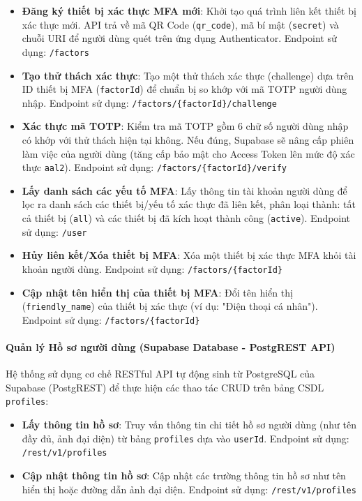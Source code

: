 \begin{itemize}
\item \textbf{Đăng ký thiết bị xác thực MFA mới}:
Khởi tạo quá trình liên kết thiết bị xác thực mới. API trả về mã QR Code (\texttt{qr\_code}), mã bí mật (\texttt{secret}) và chuỗi URI để người dùng quét trên ứng dụng Authenticator.
Endpoint sử dụng: \texttt{/factors}

\item \textbf{Tạo thử thách xác thực}:
Tạo một thử thách xác thực (challenge) dựa trên ID thiết bị MFA (\texttt{factorId}) để chuẩn bị so khớp với mã TOTP người dùng nhập.
Endpoint sử dụng: \texttt{/factors/\{factorId\}/challenge}

\item \textbf{Xác thực mã TOTP}:
Kiểm tra mã TOTP gồm 6 chữ số người dùng nhập có khớp với thử thách hiện tại không. Nếu đúng, Supabase sẽ nâng cấp phiên làm việc của người dùng (tăng cấp bảo mật cho Access Token lên mức độ xác thực \texttt{aal2}).
Endpoint sử dụng: \texttt{/factors/\{factorId\}/verify}

\item \textbf{Lấy danh sách các yếu tố MFA}:
Lấy thông tin tài khoản người dùng để lọc ra danh sách các thiết bị/yếu tố xác thực đã liên kết, phân loại thành: tất cả thiết bị (\texttt{all}) và các thiết bị đã kích hoạt thành công (\texttt{active}).
Endpoint sử dụng: \texttt{/user}

\item \textbf{Hủy liên kết/Xóa thiết bị MFA}:
Xóa một thiết bị xác thực MFA khỏi tài khoản người dùng.
Endpoint sử dụng: \texttt{/factors/\{factorId\}}

\item \textbf{Cập nhật tên hiển thị của thiết bị MFA}:
Đổi tên hiển thị (\texttt{friendly\_name}) của thiết bị xác thực (ví dụ: "Điện thoại cá nhân").
Endpoint sử dụng: \texttt{/factors/\{factorId\}}

\end{itemize}

\paragraph{Quản lý Hồ sơ người dùng (Supabase Database - PostgREST API)}

Hệ thống sử dụng cơ chế RESTful API tự động sinh từ PostgreSQL của Supabase (PostgREST) để thực hiện các thao tác CRUD trên bảng CSDL \texttt{profiles}:

\begin{itemize}
\item \textbf{Lấy thông tin hồ sơ}:
Truy vấn thông tin chi tiết hồ sơ người dùng (như tên đầy đủ, ảnh đại diện) từ bảng \texttt{profiles} dựa vào \texttt{userId}.
Endpoint sử dụng: \texttt{/rest/v1/profiles}

\item \textbf{Cập nhật thông tin hồ sơ}:
Cập nhật các trường thông tin hồ sơ như tên hiển thị hoặc đường dẫn ảnh đại diện.
Endpoint sử dụng: \texttt{/rest/v1/profiles}
\end{itemize}

